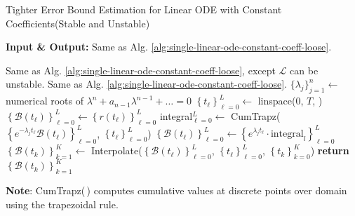 \documentclass[accepted]{uai2023}
\newcommand{\Bound}{\mathcal{B}}
\renewcommand{\L}{\mathcal{L}}
\begin{document}
    \begin{algorithm}
        \small
        \caption{Tighter Error Bound Estimation for Linear ODE with Constant Coefficients\quad  (Stable and Unstable)}\label{alg:single-linear-ode-constant-coeff-tight}
        \textbf{Input \& Output:} Same as Alg. \ref{alg:single-linear-ode-constant-coeff-loose}. 
        \begin{algorithmic}
            \Require Same as Alg. \ref{alg:single-linear-ode-constant-coeff-loose}, except $\L$ can be unstable.
            \Ensure Same as Alg. \ref{alg:single-linear-ode-constant-coeff-loose}. 
            \State $\{\lambda_j\}_{j=1}^{n} \gets$ numerical roots of $\lambda^n+a_{n-1}\lambda^{n-1}+\dots=0$
            \State $\left\{t_\ell\right\}_{\ell=0}^{L} \gets$ linspace($0$, $T$, )
            \State $\left\{\Bound(t_\ell)\right\}_{\ell=0}^{L} \gets \left\{r(t_\ell)\right\}_{\ell=0}^{L}$
                \State integral$_{\ell=0}^{L} \gets$ CumTrapz($\left\{e^{-\lambda_j t_{\ell}} \Bound(t_\ell)\right\}_{\ell=0}^{L}$, $\left\{t_\ell\right\}_{\ell=0}^{L}$) %
                \State $\left\{\Bound(t_\ell)\right\}_{\ell=0}^{L} \gets \left\{e^{\lambda_j t_{\ell}}\cdot \text{integral}_l \right\}_{\ell=0}^{L}$ 
            \EndFor
            \State $\left\{\Bound(t_k)\right\}_{k=1}^{K} \gets $ Interpolate($\left\{\Bound(t_\ell)\right\}_{\ell=0}^{L}$, $\left\{t_\ell\right\}_{\ell=0}^{L}$, $\left\{t_k\right\}_{k=0}^{K}$) %
            \State \textbf{return} $\left\{\Bound(t_k)\right\}_{k=1}^{K}$ 
        \end{algorithmic}

        \vspace{0.5em} 
        \textbf{Note}: CumTrapz(\,) computes cumulative values at discrete points over domain using the trapezoidal rule.
    \end{algorithm}
\end{document}
